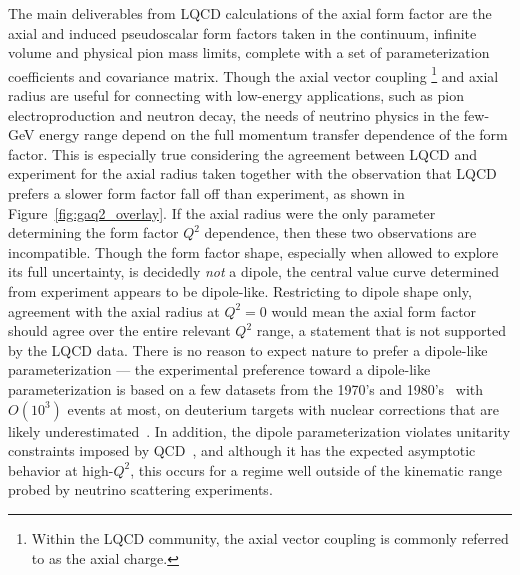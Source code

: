 \documentclass{ar-1col}
\def\asm#1{{\color{blue}#1}}
\begin{document}
The main deliverables from LQCD calculations of the axial form factor
 are the axial and induced pseudoscalar form factors taken in the continuum,
 infinite volume and physical pion mass limits, complete with a set of parameterization coefficients
 and covariance matrix.
Though the axial \asm{vector coupling}%
\footnote{Within the LQCD community, the axial vector coupling
 is commonly referred to as the axial charge.}
 and \asm{axial }radius are useful for connecting with low-energy applications,
 such as pion electroproduction and neutron decay,
 the needs of neutrino physics in the few-GeV energy range depend
 on the full momentum transfer dependence of the form factor.
 This is especially true considering the agreement between LQCD and experiment
 for the axial radius taken together with the observation that
 LQCD prefers a slower form factor fall off than experiment,
 as shown in Figure~\ref{fig:gaq2_overlay}.
If the axial radius were the only parameter determining the form factor $Q^2$ dependence,
 then these two observations are incompatible.
Though the form factor shape, especially when allowed to explore its full uncertainty,
 is decidedly \emph{not} a dipole, the central value curve determined
 from experiment appears to be dipole-like.
Restricting to dipole shape only, agreement with the axial radius at $Q^2=0$
 would mean the axial form factor should agree over the entire relevant $Q^2$ range,
 a statement that is not supported by the LQCD data.
There is no reason to expect nature to prefer a dipole-like parameterization ---
 the experimental preference toward a dipole-like parameterization is based on
 a few datasets from the 1970's and 1980's~\cite{ANL_Barish_1977, BNL_Baker_1981, Kitagaki:1983px}
 with $O(10^3)$ events at most,
 on deuterium targets with nuclear corrections that are likely underestimated~\cite{Meyer:2016oeg}.
In addition, the dipole parameterization violates
 unitarity constraints imposed by QCD~\cite{Bhattacharya:2011ah},
 and although it has the expected asymptotic behavior at high-$Q^2$,
 this occurs for a regime well outside of the kinematic range probed
 by neutrino scattering experiments.
\end{document}
